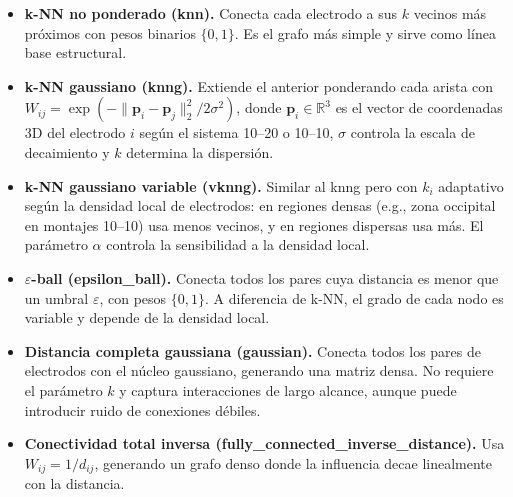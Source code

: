 \begin{itemize}[leftmargin=*,itemsep=1pt,topsep=2pt]
\item \textbf{k-NN no ponderado (knn).} Conecta cada electrodo a sus $k$ vecinos más próximos con pesos binarios $\{0,1\}$. Es el grafo más simple y sirve como línea base estructural.
\item \textbf{k-NN gaussiano (knng).} Extiende el anterior ponderando cada arista con $W_{ij} = \exp(-\|\mathbf{p}_i - \mathbf{p}_j\|_2^2 / 2\sigma^2)$, donde $\mathbf{p}_i \in \mathbb{R}^3$ es el vector de coordenadas 3D del electrodo $i$ según el sistema 10--20 o 10--10, $\sigma$ controla la escala de decaimiento y $k$ determina la dispersión.
\item \textbf{k-NN gaussiano variable (vknng).} Similar al knng pero con $k_i$ adaptativo según la densidad local de electrodos: en regiones densas (e.g., zona occipital en montajes 10--10) usa menos vecinos, y en regiones dispersas usa más. El parámetro $\alpha$ controla la sensibilidad a la densidad local.
\item \textbf{$\varepsilon$-ball (epsilon\_ball).} Conecta todos los pares cuya distancia es menor que un umbral $\varepsilon$, con pesos $\{0,1\}$. A diferencia de k-NN, el grado de cada nodo es variable y depende de la densidad local.
\item \textbf{Distancia completa gaussiana (gaussian).} Conecta todos los pares de electrodos con el núcleo gaussiano, generando una matriz densa. No requiere el parámetro $k$ y captura interacciones de largo alcance, aunque puede introducir ruido de conexiones débiles.
\item \textbf{Conectividad total inversa (fully\_connected\_inverse\_distance).} Usa $W_{ij} = 1/d_{ij}$, generando un grafo denso donde la influencia decae linealmente con la distancia.
\end{itemize}

